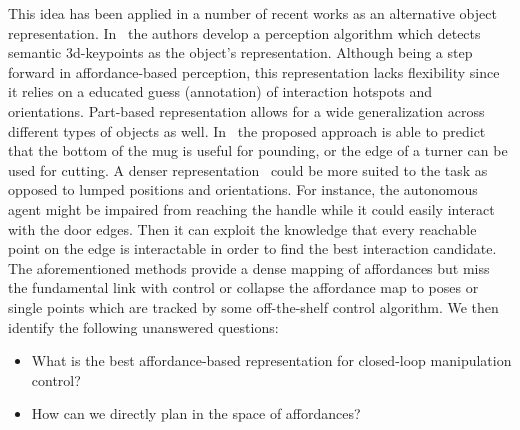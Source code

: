 This idea has been applied in a number of recent works as an alternative object representation. 
In~\cite{gao2021kpam} the authors develop a perception algorithm which detects semantic 3d-keypoints as the object's representation. Although being a step forward in affordance-based perception, this representation lacks flexibility since it relies on a educated guess (annotation) of interaction hotspots and orientations. Part-based representation allows for a wide generalization across different types of objects as well. In~\cite{myers2015affordance} the proposed approach is able to predict that the bottom of the mug is useful for pounding, or the edge of a turner can be used for cutting. A denser representation~\cite{nagarajan2019grounded, mo2021where2act} could be more suited to the task as opposed to lumped positions and orientations. For instance, the autonomous agent might be impaired from reaching the handle while it could easily interact with the door edges. Then it can exploit the knowledge that every reachable point on the edge is interactable in order to find the best interaction candidate. The aforementioned methods provide a dense mapping of affordances but miss the fundamental link with control or collapse the affordance map to poses or single points which are tracked by some off-the-shelf control algorithm. 
We then identify the following unanswered questions:
\begin{itemize}
\item What is the best affordance-based representation for closed-loop manipulation control? 
\item How can we directly plan in the space of affordances?
\end{itemize} 
 
